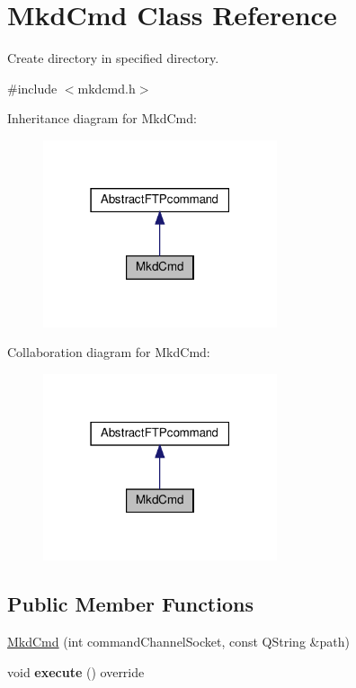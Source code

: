 \hypertarget{classMkdCmd}{}\section{Mkd\+Cmd Class Reference}
\label{classMkdCmd}


Create directory in specified directory.  




{\ttfamily \#include $<$mkdcmd.\+h$>$}



Inheritance diagram for Mkd\+Cmd\+:\nopagebreak
\begin{figure}[H]
\begin{center}
\leavevmode
\includegraphics[width=195pt]{d2/d65/classMkdCmd__inherit__graph}
\end{center}
\end{figure}


Collaboration diagram for Mkd\+Cmd\+:\nopagebreak
\begin{figure}[H]
\begin{center}
\leavevmode
\includegraphics[width=195pt]{da/d36/classMkdCmd__coll__graph}
\end{center}
\end{figure}
\subsection*{Public Member Functions}
\begin{DoxyCompactItemize}
\item 
\hyperlink{classMkdCmd_ae97092f460ff28dc54172a7d0a4c48ab}{Mkd\+Cmd} (int command\+Channel\+Socket, const Q\+String \&path)
\item 
\mbox{\label{classMkdCmd_a608b31a0199511e5b8ea01a7c5691cbf}} 
void {\bfseries execute} () override
\end{DoxyCompactItemize}
